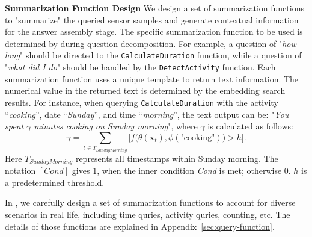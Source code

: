 \textbf{Summarization Function Design}
We design a set of summarization functions to "summarize" the queried sensor samples and generate contextual information for the answer assembly stage. The specific summarization function to be used is determined by \Method during question decomposition.
For example, a question of "\textit{how long}" should be directed to the \texttt{CalculateDuration} function, while a question of "\textit{what did I do}" should be handled by the \texttt{DetectActivity} function.
Each summarization function uses a unique template to return text information.
The numerical value in the returned text is determined by the embedding search results.
For instance, when querying \texttt{CalculateDuration} with the activity ``\textit{cooking}'', date ``\textit{Sunday}'', and time ``\textit{morning}'', the text output can be: "\textit{You spent {$\gamma$} minutes cooking on Sunday morning}", where $\gamma$ is calculated as follows:
\begin{equation}
\gamma = \sum_{t \in T_{SundayMorning}} \Bigg[ f \big( \theta(\mathbf{x}_t), \phi( \textrm{"cooking"}) \big) > h \Bigg].
\end{equation}
Here $T_{SundayMorning}$ represents all timestamps within Sunday morning. 
The notation $[Cond]$ gives $1$, when the inner condition {\it Cond} is met; otherwise $0$.
$h$ is a predetermined threshold.

In \Method, we carefully design a set of summarization functions to account for diverse scenarios in real life, including time quries, activity quries, counting, etc. The details of those functions are explained in Appendix~\ref{sec:query-function}.

